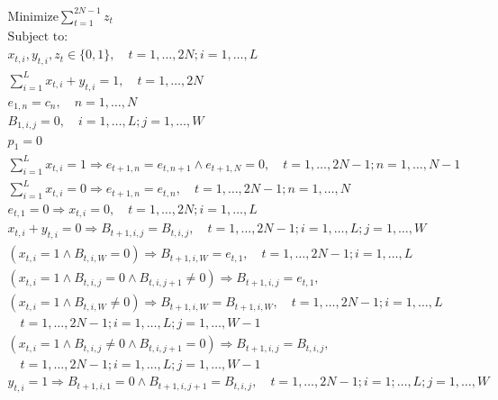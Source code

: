 \documentclass[11pt]{elsarticle}
\begin{document}
\vspace{-0.9cm}
\begin{gather}
\text{Minimize} \sum_{t=1}^{2N-1} z_t \label{eqn:target} \\
\text{Subject to:} \nonumber \\
x_{t,i}, y_{t,i}, z_{t} \in\{0,1\}, \quad t= 1, \dots, 2N; i=1,\dots, L \label{eqn:binary} \\
\sum_{i=1}^L x_{t,i}+y_{t,i} = 1, \quad t=1,\dots, 2N \label{eqn:one_operation_at_atime} \\
%
%
 e_{1,n}=c_n, \quad n=1,\dots, N \label{eqn: Sequence_initialization}\\
 B_{1,i,j}=0, \quad i = 1, \dots, L; j=1, \dots, W \label{eqn: Buffer_initialization} \\
 p_1 = 0 \label{eqn: Initialization_currentcolor} \\
%
%
 \sum_{i=1}^L x_{t,i} =1 \Rightarrow e_{t+1,n}= e_{t,n+1}\wedge e_{t+1,N}=0, \quad t=1, \dots, 2N-1; n=1, \dots, N-1 \label{eqn: Sequence_update1}\\
 \sum_{i=1}^L x_{t,i} =0 \Rightarrow e_{t+1,n}=e_{t,n}, \quad t=1, \dots, 2N-1; n=1, \dots, N \label{eqn: Sequence_update0}\\
 e_{t,1} =0 \Rightarrow x_{t,i}=0, \quad t=1, \dots, 2N; i=1, \dots, L \label{eqn: NoStorage}\\
%
%
 x_{t,i}+y_{t,i}=0 \Rightarrow B_{t+1,i,j} = B_{t,i,j}, \quad t=1,\dots, 2N-1; i=1, \dots, L; j=1,\dots, W  \label{eqn: NoBufferUpdate}\\ 
(x_{t,i}=1 \wedge B_{t,i,W}=0)  \Rightarrow B_{t+1,i,W}=e_{t,1}, \quad t=1,\dots, 2N-1; i=1, \dots, L \label{eqn: Buffer_Update_x_rightmost1}\\
(x_{t,i}=1 \wedge B_{t,i,j}=0 \wedge B_{t,i,j+1}\neq 0 ) \Rightarrow B_{t+1,i,j}=e_{t,1}, \label{eqn: Buffer_Update_x_3}\\
(x_{t,i}=1 \wedge B_{t,i,W} \neq 0)  \Rightarrow B_{t+1,i,W}=B_{t+1,i,W}, \quad t=1,\dots, 2N-1; i=1, \dots, L \label{eqn: Buffer_Update_x_rightmost2}\\
\quad t=1,\dots, 2N-1; i=1, \dots, L; j=1,\dots, W-1 \nonumber \\
(x_{t,i}=1 \wedge B_{t,i,j} \neq 0 \wedge B_{t,i,j+1}=0)  \Rightarrow B_{t+1,i,j}=B_{t,i,j},
\label{eqn: Buffer_Update_x_4}\\
\quad t=1,\dots, 2N-1; i=1, \dots, L; j=1,\dots, W-1  \nonumber\\
y_{t,i}=1 \Rightarrow B_{t+1,i,1}=0 \wedge B_{t+1,i,j+1} = B_{t,i,j}, \quad t=1,\dots, 2N-1; i=1; \dots, L; j=1,\dots, W

\end{gather}
\end{document}
